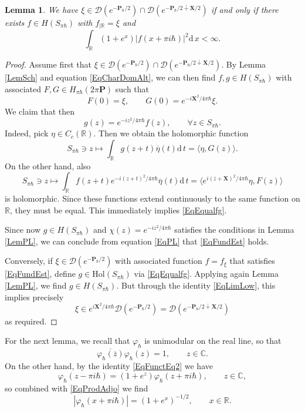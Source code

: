 \documentclass[11pt, reqno]{amsart}
\newtheorem{lemma}[theorem]{Lemma}
\theoremstyle{definition}
\numberwithin{equation}{section}
\def\C{\mathbb C}
\def\msD{\mathscr D}
\def\R{\mathbb R}
\newcommand{\Pb}{\mathbf{P}}
\newcommand{\Xb}{\mathbf{X}}
\newcommand{\rd}{\mathrm{d}\!\,}
\newcommand{\Hol}{\mathrm{Hol}}
\begin{document}
\begin{lemma}\label{LemDomainInt}
We have $\xi\in \msD(e^{-\Pb_{\hbar}/2}) \cap \msD(e^{-\Pb_{\hbar}/2\dotplus \Xb/2})$ if and only if there exists $f \in H(S_{\pi\hbar})$ with $f_{\mid \R} = \xi$ and 
\begin{equation}\label{EqFundEst}
\int_{\R} (1+e^{x}) |f(x+\pi i \hbar)|^2\rd x<\infty.
\end{equation}
\end{lemma} 
\begin{proof}
Assume first that $\xi \in \msD(e^{-\Pb_{\hbar}/2}) \cap \msD(e^{-\Pb_{\hbar}/2\dotplus \Xb/2})$. By Lemma \ref{LemSch} and equation \eqref{EqCharDomAlt}, we can then find $f,g\in H(S_{\pi\hbar})$ with associated $F,G \in H_{\pi\hbar}(2\pi \Pb)$ such that 
\[
F(0) = \xi,\qquad G(0) = e^{-i\Xb^2/4\pi\hbar} \xi.
\]
We claim that then 
\begin{equation}\label{EqEqualfg} 
g(z) = e^{-iz^2/4\pi \hbar}f(z),\qquad \forall z\in S_{\pi\hbar}. 
\end{equation}
Indeed, pick $\eta \in C_c(\R)$. Then we obtain the holomorphic function 
\[
S_{\pi\hbar}\ni z \mapsto \int_{\R} g(z+t)\overline{\eta}(t) \rd t  = \langle \eta,G(z)\rangle.
\]
On the other hand, also 
\[
S_{\pi\hbar}\ni z \mapsto \int_{\R} f(z+t)e^{-i(z+t)^2/4\pi \hbar}\overline{\eta}(t) \rd t  = \langle e^{i(\overline{z}+\Xb)^2/4\pi\hbar}\eta,F(z)\rangle
\]
is holomorphic. Since these functions extend continuously to the same function on $\R$, they must be equal. This immediately implies \eqref{EqEqualfg}.

Since now $g \in H(S_{\pi\hbar})$ and $\chi(z) = e^{-iz^2/4\pi\hbar}$ satisfies the conditions in Lemma \ref{LemPL}, we can conclude from equation \eqref{EqPL} that \eqref{EqFundEst} holds. 

Conversely, if $\xi \in \msD(e^{-\Pb_{\hbar}/2})$ with associated function $f = f_{\xi}$ that satisfies \eqref{EqFundEst}, define $g\in \Hol(S_{\pi\hbar})$ via \eqref{EqEqualfg}. Applying again Lemma \ref{LemPL},  we find $g\in H(S_{\pi \hbar})$. But through the identity \eqref{EqLimLow}, this implies precisely 
\[
\xi \in e^{i\Xb^2/4\pi\hbar}\msD(e^{-\Pb_{\hbar}/2}) = \msD(e^{-\Pb_{\hbar}/2\dotplus \Xb/2})
\]
as required.
\end{proof}

For the next lemma, we recall that $\varphi_{\hbar}$ is unimodular on the real line, so that 
\begin{equation}\label{EqProdAdjo}
\overline{\varphi_{\hbar}(\overline{z})}\varphi_{\hbar}(z) = 1,\qquad z\in \C. 
\end{equation}
On the other hand, by the identity \eqref{EqFunctEq2} we have
\begin{equation}\label{EqFunctEq2n}
\varphi_{\hbar}(z-\pi i\hbar) = (1+e^z)\varphi_{\hbar}(z+\pi i \hbar),\qquad z\in \C,
\end{equation}
so combined with \eqref{EqProdAdjo} we find
\begin{equation}\label{EqValueShift}
|\varphi_{\hbar}(x+\pi i \hbar)| = (1+e^x)^{-1/2},\qquad x\in \R.
\end{equation}
\end{document}
